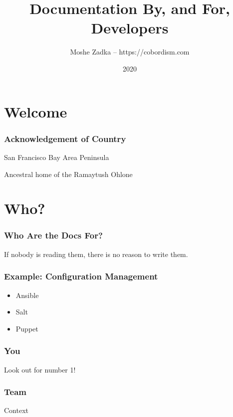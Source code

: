 \usepackage{hyperref}
\usepackage{graphicx}
\usepackage{listings}
\usepackage{textcomp}
\usepackage{fancyvrb}

\title{Documentation By, and For, Developers}
\author{Moshe Zadka -- https://cobordism.com}
\date{2020}


\begin{titlepage}
\maketitle
\end{titlepage}

\section{Welcome}

\frame{\titlepage}

\begin{frame}
\frametitle{Acknowledgement of Country}

San Francisco Bay Area Peninsula

Ancestral home of the Ramaytush Ohlone

\end{frame}

\section{Who?}

\begin{frame}
\frametitle{Who Are the Docs For?}

If nobody is reading them,
there is no reason to write them.
\end{frame}

\begin{frame}
\frametitle{Example: Configuration Management}

\begin{itemize}
\item Ansible
\item Salt
\item Puppet
\end{itemize}

\end{frame}


\begin{frame}
\frametitle{You}

Look out for number 1!
\end{frame}


\begin{frame}
\frametitle{Team}

Context

\end{frame}

